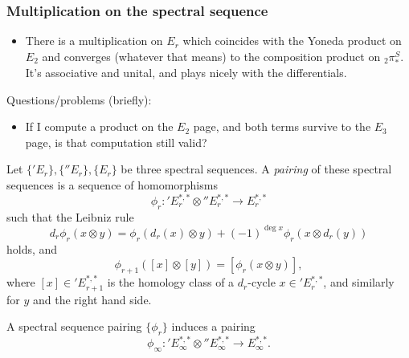 \documentclass{MetricNotes2023}
\begin{document}
\subsubsection{Multiplication on the spectral sequence}

\begin{itemize}
\item There is a multiplication on \(E_r\) which coincides with the Yoneda product on \(E_2\) and converges (whatever that means) to the composition product on \(\text{}_2\pi_*^S\). It's associative and unital, and plays nicely with the differentials. 
\end{itemize}

Questions/problems (briefly):
\begin{itemize}
\item If I compute a product on the \(E_2\) page, and both terms survive to the \(E_3\) page, is that computation still valid?
\end{itemize}

\begin{definition}
Let \(\{'E_r\}, \{''E_r\}, \{E_r\}\) be three spectral sequences. A \textit{pairing} of these spectral sequences is a sequence of homomorphisms 
\[\phi_r : \text{}'E_r^{*,*}\otimes \text{}''E_r^{*,*} \to E_r^{*,*}\]
such that the Leibniz rule
\[d_r\phi_r(x\otimes y)=\phi_r(d_r(x)\otimes y)+(-1)^{\deg x}\phi_r(x\otimes d_r(y))\]
holds, and
\[\phi_{r+1}([x]\otimes[y])=[\phi_r(x\otimes y)],\]
where \([x]\in \text{}'E_{r+1}^{*,*}\) is the homology class of a \(d_r\)-cycle \(x\in \text{}'E_r^{*,*}\), and similarly for \(y\) and the right hand side. 
\end{definition}

A spectral sequence pairing \(\{\phi_r\}\) induces a pairing 
\[\phi_\infty : \text{}'E_\infty^{*,*}\otimes \text{}''E^{*,*}_\infty \to E^{*,*}_\infty.\]
\end{document}
